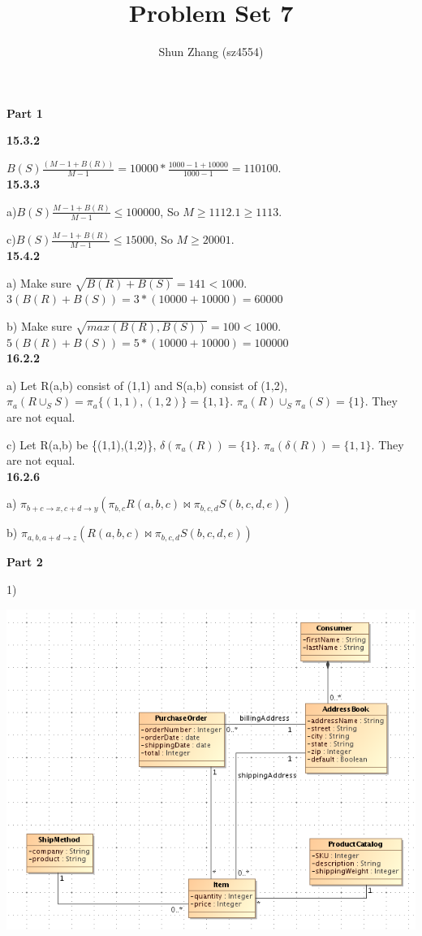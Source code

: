 \documentclass[12pt]{article}
\title{Problem Set 7}
\author{Shun Zhang (sz4554)}
\begin{document}
\maketitle

\textbf{Part 1}

\textbf{15.3.2}

$B(S)\frac{(M-1+B(R))}{M-1} = 10000*\frac{1000-1+10000}{1000-1} = 110100$.
\\

\textbf{15.3.3}

a)$B(S)\frac{M-1+B(R)}{M-1} \leq 100000$, So $M \geq 1112.1 \geq 1113$.

c)$B(S)\frac{M-1+B(R)}{M-1} \leq 15000$, So $M \geq 20001$.
\\

\textbf{15.4.2}

a) Make sure $\sqrt{B(R)+B(S)} = 141 < 1000$. $3(B(R)+B(S)) = 3 * (10000 + 10000) = 60000$

b) Make sure $\sqrt{max(B(R),B(S))} = 100 < 1000$. $5(B(R)+B(S)) = 5 * (10000 + 10000) = 100000$
\\

\textbf{16.2.2}

a) Let R(a,b) consist of (1,1) and S(a,b) consist of (1,2), $\pi_{a}{(R \cup_{S} S)} = \pi_{a}{\{(1,1), (1,2)\}} = \{1,1\}$. $\pi_{a}{(R)} \cup_{S} \pi_{a}{(S)} = \{1\}$. They are not equal.

c) Let R(a,b) be \{(1,1),(1,2)\}, $\delta (\pi_{a}{(R)}) = \{1\}$. $\pi_{a}{(\delta (R))} = \{1, 1\}$. They are not equal.
\\

\textbf{16.2.6}

a) $\pi_{b+c \rightarrow x, c+d \rightarrow y}{(\pi_{b,c}{R(a,b,c)} \Join \pi_{b,c,d}{S(b,c,d,e)})}$

b) $\pi_{a, b, a+d \rightarrow z}{(R(a,b,c) \Join \pi_{b,c,d}{S(b,c,d,e)})}$
\\

\pagebreak

\textbf{Part 2}

1)

\includegraphics[width=140mm]{a.png}
\end{document}
